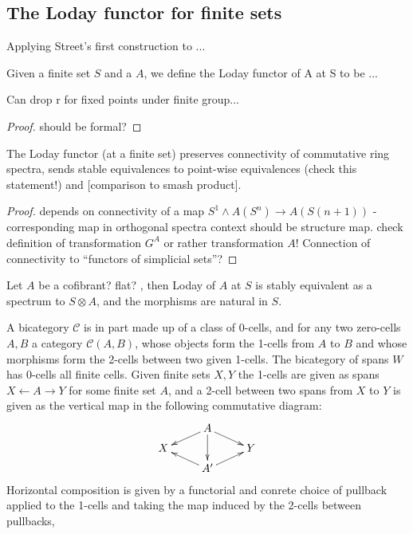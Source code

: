   \subsection{The Loday functor for finite sets}
    \begin{defn}\label{def_rectification_of_G^A}
      Applying Street's first construction to ...
    \end{defn}

    \begin{defn}\label{def_loday_functor_finite_sets}
      Given a finite set $S$ and a \hring $A$, we define the Loday functor of A at S to be ...
    \end{defn}

    \begin{lem}\label{lem_loday_functor_fixed_points}
      Can drop r for fixed points under finite group...
      \begin{proof}
        should be formal?
      \end{proof}
    \end{lem}

    \begin{lem}\label{lem_loday_functor_preserves_connectivity}
      The Loday functor (at a finite set) preserves connectivity of commutative ring spectra, sends stable equivalences to point-wise equivalences (check this statement!) and [comparison to smash product].
      \begin{proof}
        depends on connectivity of a map $S^1 \wedge A(S^n) \to A(S(n+1))$ - corresponding map in orthogonal spectra context should be structure map. check definition of transformation $G^A$ or rather transformation $A$! Connection of connectivity to ``functors of simplicial sets''?
      \end{proof}
    \end{lem}

    \begin{cor}\label{cor_loday_at_S_naturally_equivalent_to_tensor_with_S}
      Let $A$ be a cofibrant? flat? \hring, then Loday of $A$ at $S$ is stably equivalent as a spectrum to $S \otimes A$, and the morphisms are natural in $S$.
    \end{cor}


    A bicategory $\mathcal{C}$ is in part made up of a class of 0-cells, and for any two zero-cells $A,B$ a category $\mathcal{C}(A,B)$, whose objects form the 1-cells from $A$ to $B$ and whose morphisms form the 2-cells between two given 1-cells. The bicategory of spans $W$ has 0-cells all finite cells. Given finite sets $X,Y$ the 1-cells are given as spans $ X \leftarrow A \rightarrow Y$ for some finite set $A$, and a 2-cell between two spans from $X$ to $Y$  is given as the vertical map in the following commutative diagram:
    \[
    \xymatrix@R-=.5em{
      &
      A \ar[dl] \ar[dd] \ar[dr]
      \\
      X
      &
      &
      Y
      \\
      &
      A^\prime \ar[ul] \ar[ur]
      &
    }
    \]
    Horizontal composition is given by a functorial and conrete choice of pullback applied to the 1-cells and taking the map induced by the 2-cells between pullbacks,

